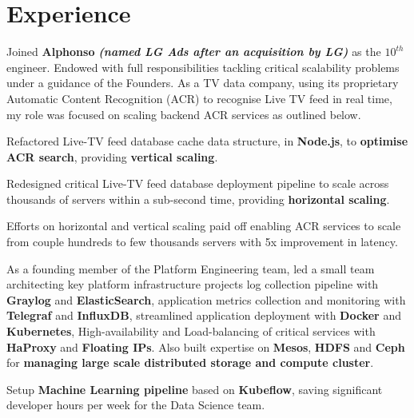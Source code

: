 \documentclass[]{deedy-resume-openfont}
\begin{document}
\begin{minipage}[t]{0.66\textwidth} 


\section{Experience}
\vspace{\topsep} %
\begin{tightemize}
\item Joined \textbf{Alphonso} {\footnotesize \textit{\textbf{(named LG Ads after an acquisition by LG) }}} as the $10^{th}$ engineer. Endowed with full responsibilities tackling critical scalability problems under a guidance of the Founders. As a TV data company, using its proprietary Automatic Content Recognition (ACR) to recognise Live TV feed in real time, my role was focused on scaling backend ACR services as outlined below.
\item Refactored Live-TV feed database cache data structure, in \textbf{Node.js}, to \textbf{optimise ACR search}, providing \textbf{vertical scaling}.
\item Redesigned critical Live-TV feed database deployment pipeline to scale across thousands of servers within a sub-second time, providing \textbf{horizontal scaling}.
\item Efforts on horizontal and vertical scaling paid off enabling ACR services to scale from couple hundreds to few thousands servers with 5x improvement in latency.
\item As a founding member of the Platform Engineering team, led a small team architecting key platform infrastructure projects \textemdash log collection pipeline with \textbf{Graylog} and \textbf{ElasticSearch}, application metrics collection and monitoring with \textbf{Telegraf} and \textbf{InfluxDB}, streamlined application deployment with \textbf{Docker} and \textbf{Kubernetes}, High-availability and Load-balancing of critical services with \textbf{HaProxy} and \textbf{Floating IPs}. Also built expertise on \textbf{Mesos}, \textbf{HDFS} and \textbf{Ceph} for \textbf{managing large scale distributed storage and compute cluster}.
\item Setup \textbf{Machine Learning pipeline} based on \textbf{Kubeflow}, saving significant developer hours per week for the Data Science team.
\end{tightemize}
\sectionsep


\end{minipage}
\end{document}
